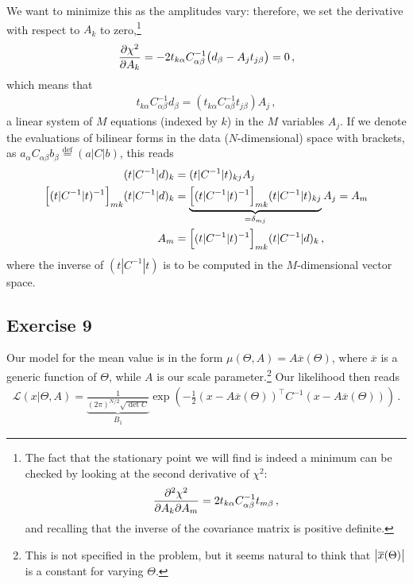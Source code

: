 \documentclass[main.tex]{subfiles}
\begin{document}
We want to minimize this as the amplitudes vary: therefore, we set the derivative with respect to \(A_k\) to zero,\footnote{The fact that the stationary point we will find is indeed a minimum can be checked by looking at the second derivative of \(\chi^2\): 
%
\begin{align}
\pdv[2]{\chi ^2}{A_k}{A_m} = 2 t_{k \alpha } C_{\alpha \beta }^{-1} t_{m \beta } 
\,,
\end{align}
%
and recalling that the inverse of the covariance matrix is positive definite.
}
%
\begin{align}
\pdv{\chi^2}{A_k} = -2 t_{k \alpha } C^{-1}_{\alpha \beta } \qty(d_\beta - A_j t_{j \beta }) = 0
\,,
\end{align}
%
which means that 
%
\begin{align}
t_{k \alpha } C^{-1}_{\alpha \beta } d_\beta = (t_{k \alpha } C^{-1}_{\alpha \beta }  t_{j \beta }) A_j
\,,
\end{align}
%
a linear system of \(M\) equations (indexed by \(k\)) in the \(M\) variables \(A_j\). 
If we denote the evaluations of bilinear forms in the data (\(N\)-dimensional) space with brackets, as \(a_\alpha C_{\alpha \beta } b_\beta \overset{\text{def}}{=} (a | C |b)\), this reads 
%
\begin{align}
(t | C^{-1} | d)_k &= (t | C^{-1} | t)_{kj} A_j  \\
\qty[(t | C^{-1} | t)^{-1}]_{mk} (t | C^{-1} | d)_k  &=
\underbrace{ \qty[(t | C^{-1} | t)^{-1}]_{mk}
(t | C^{-1} | t)_{kj}}_{= \delta_{mj}} A_j = A_m  \\
A_m &= \qty[(t | C^{-1} | t)^{-1}]_{mk} (t | C^{-1} | d)_k
\,, \label{eq:template-fitting}
\end{align}
%
where the inverse of \((t | C^{-1} | t)\) is to be computed in the \(M\)-dimensional vector space. 

\subsection{Exercise 9}

Our model for the mean value is in the form \(\mu (\Theta , A) = A \overline{x}(\Theta )\), where \(\overline{x}\) is a generic function of \(\Theta \), while \(A\) is our scale parameter.\footnote{This is not specified in the problem, but it seems natural to think that \(\abs{\overline{x}(\Theta )}\) is a constant for varying \(\Theta \). } 
Our likelihood then reads 
%
\begin{align}
\mathscr{L}(x | \Theta , A) = \underbrace{\frac{1}{(2\pi )^{N/2} \sqrt{\det C}}}_{B_1 }
\exp(- \frac{1}{2} (x - A \overline{x}(\Theta ))^{\top} C^{-1} (x- A \overline{x}(\Theta )))
\,.
\end{align}
\end{document}
